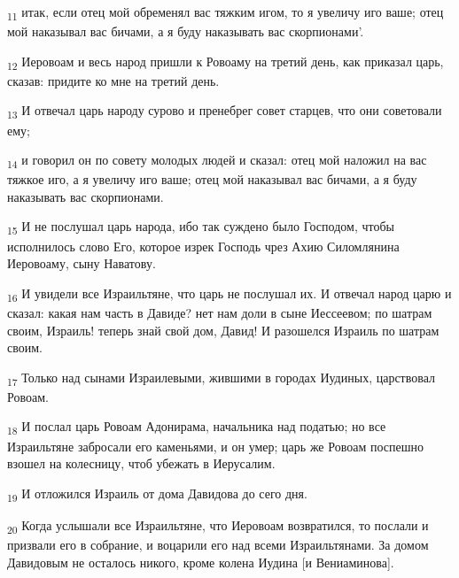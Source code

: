 \begin{tcolorbox}
\textsubscript{11} итак, если отец мой обременял вас тяжким игом, то я увеличу иго ваше; отец мой наказывал вас бичами, а я буду наказывать вас скорпионами'.
\end{tcolorbox}
\begin{tcolorbox}
\textsubscript{12} Иеровоам и весь народ пришли к Ровоаму на третий день, как приказал царь, сказав: придите ко мне на третий день.
\end{tcolorbox}
\begin{tcolorbox}
\textsubscript{13} И отвечал царь народу сурово и пренебрег совет старцев, что они советовали ему;
\end{tcolorbox}
\begin{tcolorbox}
\textsubscript{14} и говорил он по совету молодых людей и сказал: отец мой наложил на вас тяжкое иго, а я увеличу иго ваше; отец мой наказывал вас бичами, а я буду наказывать вас скорпионами.
\end{tcolorbox}
\begin{tcolorbox}
\textsubscript{15} И не послушал царь народа, ибо так суждено было Господом, чтобы исполнилось слово Его, которое изрек Господь чрез Ахию Силомлянина Иеровоаму, сыну Наватову.
\end{tcolorbox}
\begin{tcolorbox}
\textsubscript{16} И увидели все Израильтяне, что царь не послушал их. И отвечал народ царю и сказал: какая нам часть в Давиде? нет нам доли в сыне Иессеевом; по шатрам своим, Израиль! теперь знай свой дом, Давид! И разошелся Израиль по шатрам своим.
\end{tcolorbox}
\begin{tcolorbox}
\textsubscript{17} Только над сынами Израилевыми, жившими в городах Иудиных, царствовал Ровоам.
\end{tcolorbox}
\begin{tcolorbox}
\textsubscript{18} И послал царь Ровоам Адонирама, начальника над податью; но все Израильтяне забросали его каменьями, и он умер; царь же Ровоам поспешно взошел на колесницу, чтоб убежать в Иерусалим.
\end{tcolorbox}
\begin{tcolorbox}
\textsubscript{19} И отложился Израиль от дома Давидова до сего дня.
\end{tcolorbox}
\begin{tcolorbox}
\textsubscript{20} Когда услышали все Израильтяне, что Иеровоам возвратился, то послали и призвали его в собрание, и воцарили его над всеми Израильтянами. За домом Давидовым не осталось никого, кроме колена Иудина [и Вениаминова].
\end{tcolorbox}
